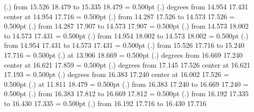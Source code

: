 {\setplotsymbol ({\thinlinefont .})
{\color[rgb]{0,0,0}\putrule from 15.526 18.479 to 15.335 18.479
}%
%
%
\linethickness= 0.500pt
\setplotsymbol ({\thinlinefont .})
{\color[rgb]{0,0,0} degrees from 14.954 17.431 center at 14.954 17.716
}%
%
%
\linethickness= 0.500pt
\setplotsymbol ({\thinlinefont .})
{\color[rgb]{0,0,0}\putrule from 14.287 17.526 to 14.573 17.526
}%
%
%
\linethickness= 0.500pt
\setplotsymbol ({\thinlinefont .})
{\color[rgb]{0,0,0}\putrule from 14.287 17.907 to 14.573 17.907
}%
%
%
\linethickness= 0.500pt
\setplotsymbol ({\thinlinefont .})
{\color[rgb]{0,0,0}\putrule from 14.573 18.002 to 14.573 17.431
}%
%
%
\linethickness= 0.500pt
\setplotsymbol ({\thinlinefont .})
{\color[rgb]{0,0,0}\putrule from 14.954 18.002 to 14.573 18.002
}%
%
%
\linethickness= 0.500pt
\setplotsymbol ({\thinlinefont .})
{\color[rgb]{0,0,0}\putrule from 14.954 17.431 to 14.573 17.431
}%
%
%
\linethickness= 0.500pt
\setplotsymbol ({\thinlinefont .})
{\color[rgb]{0,0,0}\putrule from 15.526 17.716 to 15.240 17.716
}%
%
%
\linethickness= 0.500pt
\setplotsymbol ({\thinlinefont .})
{\color[rgb]{0,0,0} at 13.906 18.669
}%
%
%
\linethickness= 0.500pt
\setplotsymbol ({\thinlinefont .})
{\color[rgb]{0,0,0} degrees from 16.669 17.240 center at 16.621 17.859
}%
%
%
\linethickness= 0.500pt
\setplotsymbol ({\thinlinefont .})
{\color[rgb]{0,0,0} degrees from 17.145 17.526 center at 16.621 17.193
}%
%
%
\linethickness= 0.500pt
\setplotsymbol ({\thinlinefont .})
{\color[rgb]{0,0,0} degrees from 16.383 17.240 center at 16.002 17.526
}%
%
%
\linethickness= 0.500pt
\setplotsymbol ({\thinlinefont .})
{\color[rgb]{0,0,0} at 11.811 18.479
}%
%
%
\linethickness= 0.500pt
\setplotsymbol ({\thinlinefont .})
{\color[rgb]{0,0,0}\putrule from 16.383 17.240 to 16.669 17.240
}%
%
%
\linethickness= 0.500pt
\setplotsymbol ({\thinlinefont .})
{\color[rgb]{0,0,0}\putrule from 16.383 17.812 to 16.669 17.812
}%
%
%
\linethickness= 0.500pt
\setplotsymbol ({\thinlinefont .})
{\color[rgb]{0,0,0}\putrule from 16.192 17.335 to 16.430 17.335
}%
%
%
\linethickness= 0.500pt
\setplotsymbol ({\thinlinefont .})
{\color[rgb]{0,0,0}\putrule from 16.192 17.716 to 16.430 17.716
}}
